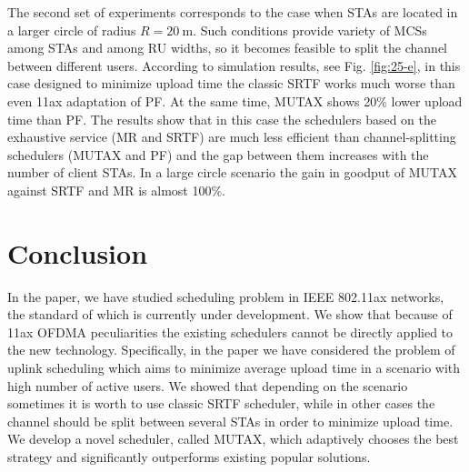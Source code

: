 The second set of experiments corresponds to the case when STAs are located in a larger circle of radius $R = \SI{20}{\m}$.
Such conditions provide variety of MCSs among STAs and among RU widths, so it becomes feasible to split the channel between different users.
According to simulation results, see Fig. \ref{fig:25-e}, in this case designed to minimize upload time the classic SRTF works much worse than even 11ax adaptation of PF. At the same time, MUTAX shows 20\% lower upload time than PF. The results show that in this case the schedulers based on the exhaustive service (MR and SRTF) are  much less efficient than channel-splitting schedulers (MUTAX and PF) and the gap between them increases with the number of client STAs. %
In a large circle scenario the gain in goodput of MUTAX against SRTF and MR is almost 100\%.


\section{Conclusion}
\label{conclusion}
In the paper, we have studied scheduling problem in IEEE 802.11ax networks, the standard of which is currently under development.
We show that because of 11ax OFDMA peculiarities the existing schedulers cannot be directly applied to the new technology.
Specifically, in the paper we have considered the problem of uplink scheduling which aims to minimize average upload time in a scenario with high number of active users.
We showed that depending on the scenario sometimes it is worth to use classic SRTF scheduler, while in other cases the channel should be split between several STAs in order to minimize upload time.
We develop a novel scheduler, called MUTAX, which adaptively chooses the best strategy and significantly outperforms existing popular solutions.


 


